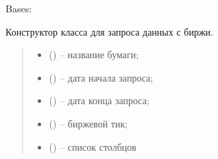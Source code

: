 \documentclass[letterpaper,10pt,english,openany,oneside]{sphinxmanual}
\begin{document}
\begin{fulllineitems}
\label{\detokenize{src.structures:src.structures.st_securities.InfoSecurityRequest}}
\pysigstartsignatures
{}
\pysigstopsignatures
\sphinxAtStartPar
Bases: 

\begin{fulllineitems}
\label{\detokenize{src.structures:src.structures.st_securities.InfoSecurityRequest.__init__}}
\pysigstartsignatures
{}
\pysigstopsignatures
\sphinxAtStartPar
Конструктор класса для запроса данных с биржи.
\begin{quote}\begin{description}
\begin{itemize}
\item {} 
\sphinxAtStartPar
{} () – название бумаги;

\item {} 
\sphinxAtStartPar
{} () – дата начала запроса;

\item {} 
\sphinxAtStartPar
{} () – дата конца запроса;

\item {} 
\sphinxAtStartPar
{} () – биржевой тик;

\item {} 
\sphinxAtStartPar
{} (\sphinxstyleliteralemphasis{\sphinxupquote{{[}}}\sphinxstyleliteralemphasis{\sphinxupquote{{]}}}) – список столбцов

\end{itemize}

\end{description}\end{quote}

\end{fulllineitems}


\end{fulllineitems}
\end{document}
